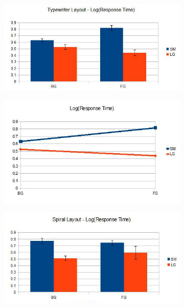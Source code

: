 \begin{figure}[h!]
\centering
\begin{subfigure}{.5\textwidth}
  \centering
  \includegraphics[scale=0.35]{typewriter-log.jpg}
\end{subfigure}%
\begin{subfigure}{.5\textwidth}
  \centering
  \includegraphics[scale=0.35]{typewriter-log-interaction.jpg}
\end{subfigure}
\begin{subfigure}{.5\textwidth}
  \centering
  \includegraphics[scale=0.35]{spiral-log.jpg}

\end{subfigure}
\end{figure}
